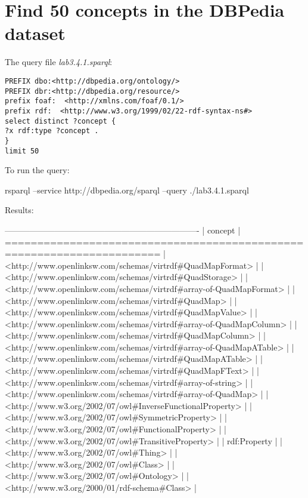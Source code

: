 \documentclass[a4paper, 12pt]{report}
\begin{document}
\section{Find 50 concepts in the DBPedia dataset}
The query file \emph{lab3.4.1.sparql}:
\begin{lstlisting}[frame=single]
PREFIX dbo:<http://dbpedia.org/ontology/>
PREFIX dbr:<http://dbpedia.org/resource/>
prefix foaf:  <http://xmlns.com/foaf/0.1/>
prefix rdf:  <http://www.w3.org/1999/02/22-rdf-syntax-ns#>
select distinct ?concept {
?x rdf:type ?concept .
}
limit 50
\end{lstlisting}
To run the query:
\begin{commandshell}
    rsparql --service http://dbpedia.org/sparql --query ./lab3.4.1.sparql
\end{commandshell}
Results:
\begin{messageshell}
----------------------------------------------------------------------
| concept                                                            |
======================================================================
| <http://www.openlinksw.com/schemas/virtrdf#QuadMapFormat>          |
| <http://www.openlinksw.com/schemas/virtrdf#QuadStorage>            |
| <http://www.openlinksw.com/schemas/virtrdf#array-of-QuadMapFormat> |
| <http://www.openlinksw.com/schemas/virtrdf#QuadMap>                |
| <http://www.openlinksw.com/schemas/virtrdf#QuadMapValue>           |
| <http://www.openlinksw.com/schemas/virtrdf#array-of-QuadMapColumn> |
| <http://www.openlinksw.com/schemas/virtrdf#QuadMapColumn>          |
| <http://www.openlinksw.com/schemas/virtrdf#array-of-QuadMapATable> |
| <http://www.openlinksw.com/schemas/virtrdf#QuadMapATable>          |
| <http://www.openlinksw.com/schemas/virtrdf#QuadMapFText>           |
| <http://www.openlinksw.com/schemas/virtrdf#array-of-string>        |
| <http://www.openlinksw.com/schemas/virtrdf#array-of-QuadMap>       |
| <http://www.w3.org/2002/07/owl#InverseFunctionalProperty>          |
| <http://www.w3.org/2002/07/owl#SymmetricProperty>                  |
| <http://www.w3.org/2002/07/owl#FunctionalProperty>                 |
| <http://www.w3.org/2002/07/owl#TransitiveProperty>                 |
| rdf:Property                                                       |
| <http://www.w3.org/2002/07/owl#Thing>                              |
| <http://www.w3.org/2002/07/owl#Class>                              |
| <http://www.w3.org/2002/07/owl#Ontology>                           |
| <http://www.w3.org/2000/01/rdf-schema#Class>                       |

\end{messageshell}
\end{document}
